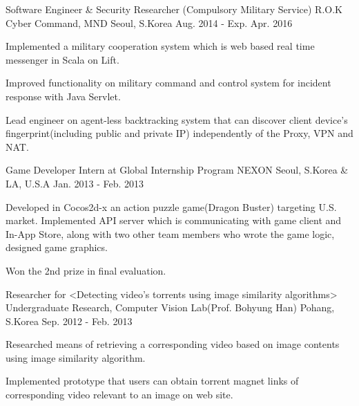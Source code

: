 \begin{cventries}

  \cventry
    {Software Engineer \& Security Researcher (Compulsory Military Service)} %
    {R.O.K Cyber Command, MND} %
    {Seoul, S.Korea} %
    {Aug. 2014 - Exp. Apr. 2016} %
    {
      \begin{cvitems} %
        \item {Implemented a military cooperation system which is web based real time messenger in Scala on Lift.}
        \item {Improved functionality on military command and control system for incident response with Java Servlet.}
        \item {Lead engineer on agent-less backtracking system that can discover client device's fingerprint(including public and private IP) independently of the Proxy, VPN and NAT.}
      \end{cvitems}
    }

  \cventry
    {Game Developer Intern at Global Internship Program} %
    {NEXON} %
    {Seoul, S.Korea \& LA, U.S.A} %
    {Jan. 2013 - Feb. 2013} %
    {
      \begin{cvitems} %
        \item {Developed in Cocos2d-x an action puzzle game(Dragon Buster) targeting U.S. market. Implemented API server which is communicating with game client and In-App Store, along with two other team members who wrote the game logic, designed game graphics.}
        \item {Won the 2nd prize in final evaluation.}
      \end{cvitems}
    }

  \cventry
    {Researcher for <Detecting video’s torrents using image similarity algorithms>} %
    {Undergraduate Research, Computer Vision Lab(Prof. Bohyung Han)} %
    {Pohang, S.Korea} %
    {Sep. 2012 - Feb. 2013} %
    {
      \begin{cvitems} %
        \item {Researched means of retrieving a corresponding video based on image contents using image similarity algorithm.}
        \item {Implemented prototype that users can obtain torrent magnet links of corresponding video relevant to an image on web site.}
      \end{cvitems} 
    }


\end{cventries}
